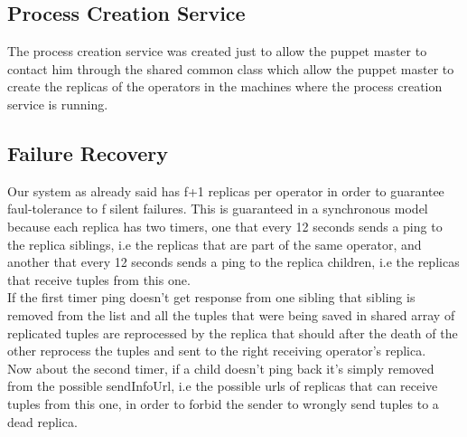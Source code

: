 \documentclass[times, 10pt, twocolumn]{article}
\begin{document}
\subsection{Process Creation Service}
The process creation service was created just to allow the puppet master to contact him through the shared common class which allow the puppet master to create the replicas of the operators in the machines where the process creation service is running.



\subsection{Failure Recovery}
Our system as already said has f+1 replicas per operator in order to guarantee faul-tolerance to f silent failures. This is guaranteed in a synchronous model because each replica has two timers, one that every 12 seconds sends a ping to the replica siblings, i.e the replicas that are part of the same operator, and another that every 12 seconds sends a ping to the replica children, i.e the replicas that receive tuples from this one.
\\If the first timer ping doesn't get response from one sibling that sibling is removed from the list and all the tuples that were being saved in shared array of replicated tuples are reprocessed by the replica that should after the death of the other reprocess the tuples and sent to the right receiving operator's replica.
\\Now about the second timer, if a child doesn't ping back it's simply removed from the possible sendInfoUrl, i.e the possible urls of replicas that can receive tuples from this one, in order to forbid the sender to wrongly send tuples to a dead replica.



\end{document}
